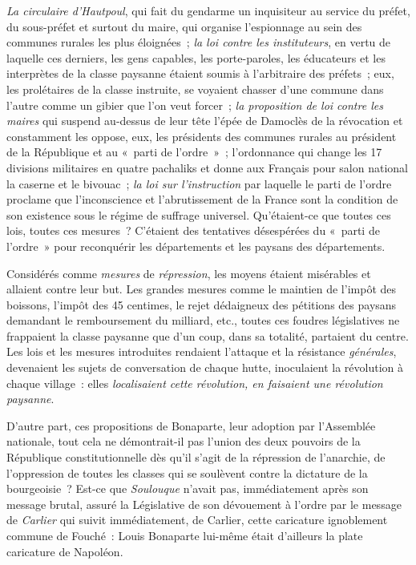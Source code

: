 \documentclass[twoside]{book} %
\begin{document}
\emph{La circulaire d’Hautpoul}, qui fait du gendarme un inquisiteur au service du préfet, du sous-préfet et surtout du maire, qui organise l’espionnage au sein des communes rurales les plus éloignées ; \emph{la loi contre les instituteurs}, en vertu de laquelle ces derniers, les gens capables, les porte-paroles, les éducateurs et les interprètes de la classe paysanne étaient soumis à l’arbitraire des préfets ; eux, les prolétaires de la classe instruite, se voyaient chasser d’une commune dans l’autre comme un gibier que l’on veut forcer ; \emph{la proposition de loi contre les maires} qui suspend au-dessus de leur tête l’épée de Damoclès de la révocation et constamment les oppose, eux, les présidents des communes rurales au président de la République et au « parti de l’ordre » ; l’ordonnance qui change les 17 divisions militaires en quatre pachaliks et donne aux Français pour salon national la caserne et le bivouac ; \emph{la loi sur l’instruction} par laquelle le parti de l’ordre proclame que l’inconscience et l’abrutissement de la France sont la condition de son existence sous le régime de suffrage universel. Qu’étaient-ce que toutes ces lois, toutes ces mesures ? C’étaient des tentatives désespérées du « parti de l’ordre » pour reconquérir les départements et les paysans des départements.\par
Considérés comme \emph{mesures} de \emph{répression}, les moyens étaient misérables et allaient contre leur but. Les grandes mesures comme le maintien de l’impôt des boissons, l’impôt des 45 centimes, le rejet dédaigneux des pétitions des paysans demandant le remboursement du milliard, etc., toutes ces foudres législatives ne frappaient la classe paysanne que d’un coup, dans sa totalité, partaient du centre. Les lois et les mesures introduites rendaient l’attaque et la résistance \emph{générales}, devenaient les sujets de conversation de chaque hutte, inoculaient la révolution à chaque village : elles \emph{localisaient cette révolution, en faisaient une révolution paysanne}.\par
D’autre part, ces propositions de Bonaparte, leur adoption par l’Assemblée nationale, tout cela ne démontrait-il pas l’union des deux pouvoirs de la République constitutionnelle dès qu’il s’agit de la répression de l’anarchie, de l’oppression de toutes les classes qui se soulèvent contre la dictature de la bourgeoisie ? Est-ce que \emph{Soulouque} n’avait pas, immédiatement après son message brutal, assuré la Législative de son dévouement à l’ordre par le message de \emph{Carlier} qui suivit immédiatement, de Carlier, cette caricature ignoblement commune de Fouché : Louis Bonaparte lui-même était d’ailleurs la plate caricature de Napoléon.\par
\end{document}
